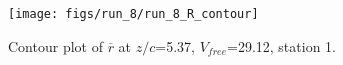 \begin{figure}[H]
\centering
\texttt{[image: figs/run\_8/run\_8\_R\_contour]}
\caption{Contour plot of $\overline{r}$ at $z/c$=5.37, $V_{free}$=29.12, station 1.}
\label{fig:run_8_R_contour}
\end{figure}


